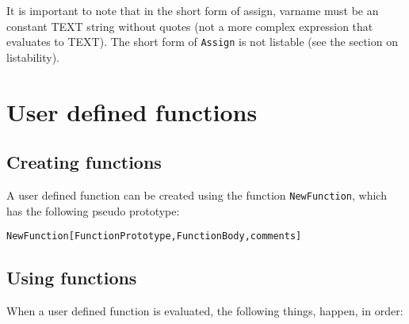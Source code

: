 It is important to note that in the short form of assign, varname must
be an constant TEXT string without quotes (not a more complex
expression that evaluates to TEXT).  The short form of \verb+Assign+
is not listable (see the section on listability).  

\section{User defined functions}

\subsection{Creating functions}
A user defined function can be created using the function
\verb+NewFunction+, which has the following pseudo prototype:  

\begin{verbatim}
NewFunction[FunctionPrototype,FunctionBody,comments]
\end{verbatim}

\subsection{Using functions}

When a user defined function is evaluated, the following things,
happen, in order:

